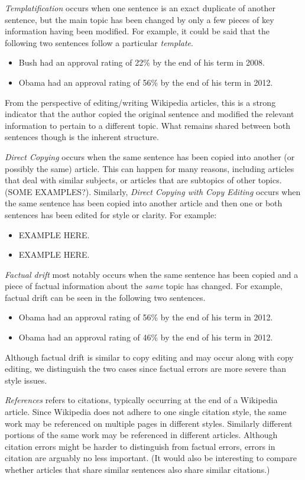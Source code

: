 \documentclass{acm_proc_article-sp}
\begin{document}
 \emph{Templatification} occurs when one sentence is an exact duplicate of another sentence, but the main topic has been changed by only a few pieces of key information having been modified. For example, it could be said that the following two sentences follow a particular \emph{template}.
\begin{itemize}[noitemsep,nolistsep]
\item Bush had an approval rating of 22\% by the end of his term in 2008.
\item Obama had an approval rating of 56\% by the end of his term in 2012.
\end{itemize}
From the perspective of editing/writing Wikipedia articles, this is a strong indicator that the author copied the original sentence and modified the relevant information to pertain to a different topic. What remains shared between both sentences though is the inherent structure.

\emph{Direct Copying} occurs when the same sentence has been copied into another (or possibly the same) article. This can happen for many reasons, including articles that deal with similar subjects, or articles that are subtopics of other topics. (SOME EXAMPLES?). Similarly, \emph{Direct Copying with Copy Editing} occurs when the same sentence has been copied into another article and then one or both sentences has been edited for style or clarity. For example:

\begin{itemize}[noitemsep,nolistsep]
\item EXAMPLE HERE.
\item EXAMPLE HERE.
\end{itemize}

\emph{Factual drift} most notably occurs when the same sentence has been copied and a piece of factual information about the \emph{same} topic has changed. For example, factual drift can be seen in the following two sentences.
\begin{itemize}[noitemsep,nolistsep]
\item Obama had an approval rating of 56\% by the end of his term in 2012.
\item Obama had an approval rating of 46\% by the end of his term in 2012.
\end{itemize}
Although factual drift is similar to copy editing and may occur along with copy editing, we distinguish the two cases since factual errors are more severe than style issues.

\emph{References} refers to citations, typically occurring at the end of a Wikipedia article. Since Wikipedia does not adhere to one single citation style, the same work may be referenced on multiple pages in different styles. Similarly different portions of the same work may be referenced in different articles. Although citation errors might be harder to distinguish from factual errors, errors in citation are arguably no less important. (It would also be interesting to compare whether articles that share similar sentences also share similar citations.) 
\end{document}
